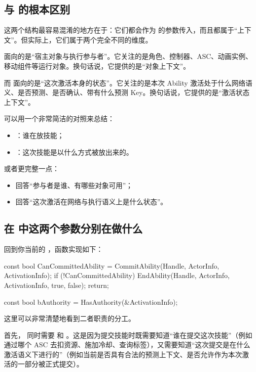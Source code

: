 \subsection{ 与  的根本区别}

这两个结构最容易混淆的地方在于：它们都会作为  的参数传入，而且都属于“上下文”。但实际上，它们属于两个完全不同的维度。

 面向的是“宿主对象与执行参与者”。它关注的是角色、控制器、ASC、动画实例、移动组件等运行对象。换句话说，它提供的是“对象上下文”。

而  面向的是“这次激活本身的状态”。它关注的是本次 Ability 激活处于什么网络语义、是否预测、是否确认、带有什么预测 Key。换句话说，它提供的是“激活状态上下文”。

可以用一个非常简洁的对照来总结：

\begin{itemize}
	\item {}：谁在放技能；
	\item {}：这次技能是以什么方式被放出来的。
\end{itemize}

或者更完整一点：

\begin{itemize}
	\item {} 回答“参与者是谁、有哪些对象可用”；
	\item {} 回答“这次激活在网络与执行语义上是什么状态”。
\end{itemize}

\subsection{在  中这两个参数分别在做什么}

回到你当前的 ，函数实现如下：

\begin{code}
	const bool CanCommittedAbility = CommitAbility(Handle, ActorInfo, ActivationInfo);
	if (!CanCommittedAbility)
	{
		EndAbility(Handle, ActorInfo, ActivationInfo, true, false);
		return;
	}
	
	const bool bAuthority = HasAuthority(&ActivationInfo);
\end{code}

这里可以非常清楚地看到二者职责的分工。

首先， 同时需要  和 。这是因为提交技能时既需要知道“谁在提交这次技能”（例如通过哪个 ASC 去扣资源、施加冷却、查询标签），又需要知道“这次提交是在什么激活语义下进行的”（例如当前是否具有合法的预测上下文、是否允许作为本次激活的一部分被正式提交）。

